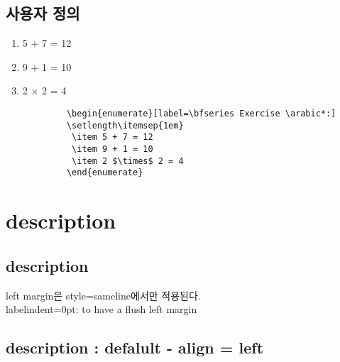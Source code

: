 	\section{사용자 정의}

			\begin{enumerate}[label=\bfseries Exercise \arabic*:]
			\setlength\itemsep{1em}
			 \item 5 + 7 = 12
			 \item 9 + 1 = 10
			 \item 2 $\times$ 2 = 4
			\end{enumerate}


		\begin{mdframed}[style=code_document, frametitle={code}]
			\begin{verbatim}
			\begin{enumerate}[label=\bfseries Exercise \arabic*:]
			\setlength\itemsep{1em}
			 \item 5 + 7 = 12
			 \item 9 + 1 = 10
			 \item 2 $\times$ 2 = 4
			\end{enumerate}
			\end{verbatim}
		\end{mdframed}



	\chapter{description}


	\section{description}


			left margin은 style=sameline에서만 적용된다.  \\

			labelindent=0pt: to have a flush left margin



	\section{description : defalult - align = left}
